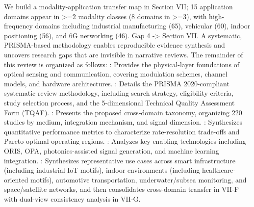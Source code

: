  We build a modality-application transfer map in Section VII; 15 application domains appear in >=2 modality classes (8 domains in >=3), with high-frequency domains including industrial manufacturing (65), vehicular (60), indoor positioning (56), and 6G networking (46).  Gap 4 -> Section VII.\markdownRendererOlItemEnd 
\markdownRendererOlEnd \markdownRendererInterblockSeparator
{}\markdownRendererBlockQuoteBegin
{} A systematic, PRISMA-based methodology enables reproducible evidence synthesis and uncovers research gaps that are invisible in narrative reviews.\markdownRendererBlockQuoteEnd \markdownRendererInterblockSeparator
{}
\markdownRendererSectionEnd \markdownRendererSectionBegin
{}\markdownRendererInterblockSeparator
{}The remainder of this review is organized as follows:\markdownRendererInterblockSeparator
{}\markdownRendererUlBegin
\markdownRendererUlItem {}: Provides the physical-layer foundations of optical sensing and communication, covering modulation schemes, channel models, and hardware architectures.\markdownRendererUlItemEnd 
\markdownRendererUlItem {}: Details the PRISMA 2020-compliant systematic review methodology, including search strategy, eligibility criteria, study selection process, and the 5-dimensional Technical Quality Assessment Form (TQAF).\markdownRendererUlItemEnd 
\markdownRendererUlItem {}: Presents the proposed cross-domain taxonomy, organizing 220 studies by medium, integration mechanism, and signal dimension.\markdownRendererUlItemEnd 
\markdownRendererUlItem {}: Synthesizes quantitative performance metrics to characterize rate-resolution trade-offs and Pareto-optimal operating regions.\markdownRendererUlItemEnd 
\markdownRendererUlItem {}: Analyzes key enabling technologies including ORIS, OPA, photonics-assisted signal generation, and machine learning integration.\markdownRendererUlItemEnd 
\markdownRendererUlItem {}: Synthesizes representative use cases across smart infrastructure (including industrial IoT motifs), indoor environments (including healthcare-oriented motifs), automotive transportation, underwater/subsea monitoring, and space/satellite networks, and then consolidates cross-domain transfer in VII-F with dual-view consistency analysis in VII-G.\markdownRendererUlItemEnd 
